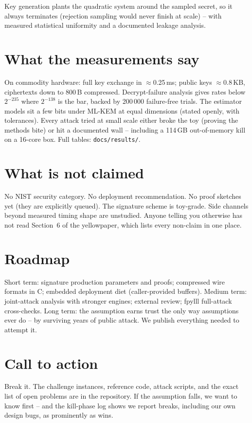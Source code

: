 \documentclass[11pt,a4paper]{article}
\begin{document}
Key generation plants the quadratic system around the sampled secret, so it
always terminates (rejection sampling would never finish at scale) -- with
measured statistical uniformity and a documented leakage analysis.

\section{What the measurements say}

On commodity hardware: full key exchange in $\approx$0.25\,ms; public keys
$\approx$0.8\,KB, ciphertexts down to 800\,B compressed. Decrypt-failure
analysis gives rates below $2^{-235}$ where $2^{-138}$ is the bar, backed
by 200\,000 failure-free trials. The estimator models sit a few bits under
ML-KEM at equal dimensions (stated openly, with tolerances). Every attack
tried at small scale either broke the toy (proving the methods bite) or hit
a documented wall -- including a 114\,GB out-of-memory kill on a 16-core
box. Full tables: \texttt{docs/results/}.

\section{What is not claimed}

No NIST security category. No deployment recommendation. No proof sketches
yet (they are explicitly queued). The signature scheme is toy-grade. Side
channels beyond measured timing shape are unstudied. Anyone telling you
otherwise has not read Section~6 of the yellowpaper, which lists every
non-claim in one place.

\section{Roadmap}

Short term: signature production parameters and proofs; compressed wire
formats in C; embedded deployment diet (caller-provided buffers).
Medium term: joint-attack analysis with stronger engines; external review;
fpylll full-attack cross-checks. Long term: the assumption earns trust the
only way assumptions ever do -- by surviving years of public attack. We
publish everything needed to attempt it.

\section{Call to action}

Break it. The challenge instances, reference code, attack scripts, and the
exact list of open problems are in the repository. If the assumption falls,
we want to know first -- and the kill-phase log shows we report breaks,
including our own design bugs, as prominently as wins.
\end{document}
